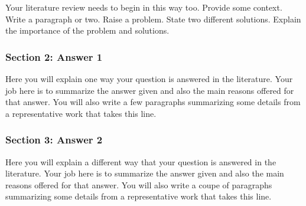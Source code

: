 \documentclass[oneside]{article}
\begin{document}
Your literature review needs to begin in this way too. Provide some
context. Write a paragraph or two. Raise a problem. State two different
solutions. Explain the importance of the problem and solutions.

\subsubsection{Section 2: Answer 1}\label{section-2-answer-1}

Here you will explain one way your question is answered in the
literature. Your job here is to summarize the answer given and also the
main reasons offered for that answer. You will also write a few
paragraphs summarizing some details from a representative work that
takes this line.

\subsubsection{Section 3: Answer 2}\label{section-3-answer-2}

Here you will explain a different way that your question is answered in
the literature. Your job here is to summarize the answer given and also
the main reasons offered for that answer. You will also write a coupe of
paragraphs summarizing some details from a representative work that
takes this line.
\end{document}
